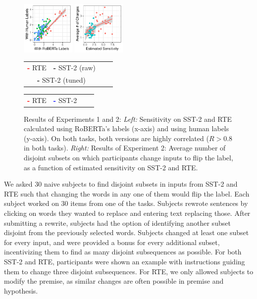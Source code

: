 \documentclass[11pt,a4paper]{article}
\begin{document}
\begin{figure}
    \centering
\includegraphics[width=0.23\textwidth]{experiments/100-rte/Submiterator-master/figures/rte_sst_sensitivities_expt1.pdf}
\includegraphics[width=0.23\textwidth]{experiments/102-rte/Submiterator-master/figures/sensitivity-changes-sst2-rte.pdf}

\begin{center}
\begin{tabular}{llll}
	{\Huge{\textbf{\textcolor{red}{-}}}} \footnotesize{RTE}&
	{\Huge\textbf{\textcolor{blue2}{-}}} \footnotesize{SST-2 (raw)}\\
	\multicolumn{2}{c}{{\Huge{\textbf{\textcolor{blue1}{-}}}} \footnotesize{SST-2 (tuned)}} &
\end{tabular}
\begin{tabular}{llll}
	{\Huge\textbf{\textcolor{red}{-}}} \footnotesize{RTE}&
	{\Huge\textbf{\textcolor{blue}{-}}} \footnotesize{SST-2}\\
\end{tabular}
\end{center}


	\caption{Results of Experiments 1 and 2: \textit{Left:} Sensitivity on SST-2 and RTE calculated using RoBERTa's labels (x-axis) and using human labels (y-axis). On both tasks, both versions are highly correlated ($R > 0.8$ in both tasks). \textit{Right:} Results of Experiment 2: Average number of disjoint subsets on which participants change inputs to flip the label, as a function of estimated sensitivity on SST-2 and RTE.}
    \label{fig:expt1}\label{fig:expt2}
\end{figure}

We asked 30 naive subjects to find disjoint subsets in inputs from SST-2 and RTE such that changing the words in any one of them would flip the label.
Each subject worked on 30 items from one of the tasks.
Subjects rewrote sentences by clicking on words they wanted to replace and entering text replacing those.
After submitting a rewrite, subjects had the option of identifying another subset disjoint from the previously selected words.
Subjects changed at least one subset for every input, and were provided a bonus for every additional subset, incentivizing them to find as many disjoint subsequences as possible.
For both SST-2 and RTE, participants were shown an example with instructions guiding them to change three disjoint subsequences.
For RTE, we only allowed subjects to modify the premise, as similar changes are often possible in premise and hypothesis.
\end{document}
